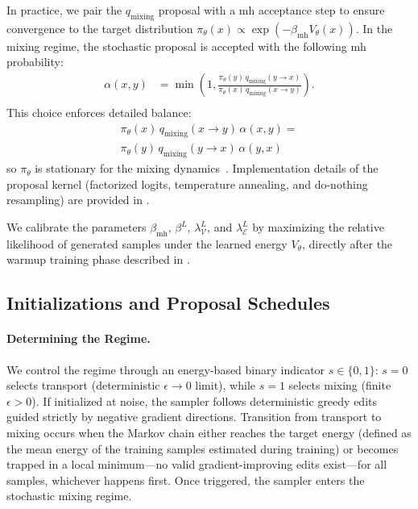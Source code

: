In practice, we pair the \( q_\mathrm{mixing} \) proposal with a \gls{mh} acceptance step to ensure convergence to the target distribution \( \pi_\theta(x) \propto \exp(-\beta_{\mathrm{mh}} V_\theta(x)) \).
In the mixing regime, the stochastic proposal is accepted with the following \gls{mh} probability:
\begin{equation}\label{eq:mh-accept}
\begin{aligned}
\alpha(x,y)
&=\min\left(1,\frac{\pi_\theta(y)\,q_{\mathrm{mixing}}(y\to x)}{\pi_\theta(x)\,q_{\mathrm{mixing}}(x\to y)}\right).\\
\end{aligned}
\end{equation}
This choice
enforces detailed balance:
\begin{equation}\label{eq:mh-detailed-balance}
\begin{aligned}
\pi_\theta(x)\,q_{\mathrm{mixing}}(x\to y)\,\alpha(x,y)
= \\
\pi_\theta(y)\,q_{\mathrm{mixing}}(y\to x)\,\alpha(y,x)
\end{aligned}
\end{equation}
so $\pi_\theta$ is stationary for the mixing dynamics~\citep{metropolis1953equation,hastings1970monte}.
Implementation details of the proposal kernel (factorized logits, temperature annealing, and do-nothing
resampling) are provided in . 

We calibrate the parameters $\beta_{\mathrm{mh}}$, $\beta^{L}$, $\lambda_{\mathcal{V}}^{L}$, and $\lambda_{\mathcal{E}}^{L}$ by maximizing the relative likelihood of generated samples under the learned energy $V_\theta$, directly after the warmup training phase described in .




\subsection{Initializations and Proposal Schedules}

\paragraph{Determining the Regime.}
\label{switch}
We control the regime through an energy-based binary indicator $s\in\{0,1\}$: $s=0$ selects transport (deterministic $\epsilon\to 0$ limit), while $s=1$ selects mixing (finite $\epsilon>0$). If initialized at noise, the sampler follows deterministic greedy edits guided strictly by negative gradient directions. Transition from transport to mixing occurs when the Markov chain either reaches the target energy (defined as the mean energy of the training samples estimated during training) or becomes trapped in a local minimum—no valid gradient-improving edits exist—for all samples, whichever happens first. Once triggered, the sampler enters the stochastic mixing regime.

